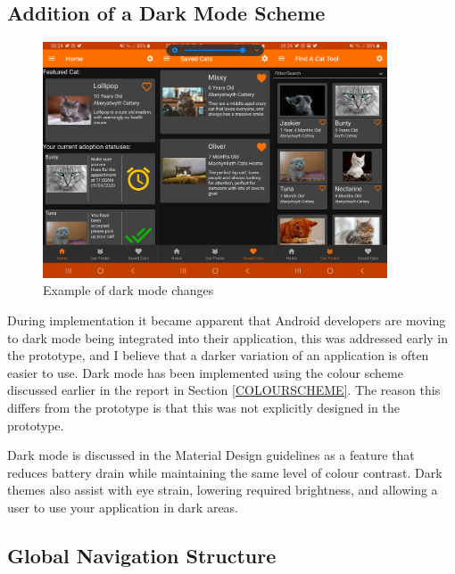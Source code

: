 \subsection{Addition of a Dark Mode Scheme}

\begin{figure} [htbp!]
    \centering
    \includegraphics[height=7cm]{Images/DarkMode.png}
    \caption{Example of dark mode changes}
    \label{fig:dark_mode}
\end{figure}

During implementation it became apparent that Android developers are moving to dark mode being integrated into their application, this was addressed early in the prototype, and I believe that a darker variation of an application is often easier to use. Dark mode has been implemented using the colour scheme discussed earlier in the report in Section \ref{COLOURSCHEME}. The reason this differs from the prototype is that this was not explicitly designed in the prototype.

Dark mode is discussed in the Material Design guidelines as a feature that reduces battery drain while maintaining the same level of colour contrast. Dark themes also assist with eye strain, lowering required brightness, and allowing a user to use your application in dark areas.

\subsection{Global Navigation Structure}

